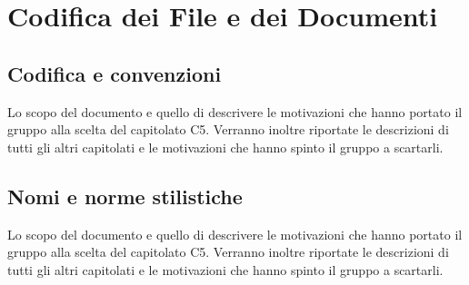 \section{Codifica dei File e dei Documenti}
\subsection{Codifica e convenzioni}
Lo scopo del documento e quello di descrivere le motivazioni che hanno portato il gruppo alla scelta del capitolato C5.
Verranno inoltre riportate le descrizioni di tutti gli altri capitolati e le motivazioni che hanno spinto il gruppo a scartarli.

\subsection{Nomi e norme stilistiche}
Lo scopo del documento e quello di descrivere le motivazioni che hanno portato il gruppo alla scelta del capitolato C5.
Verranno inoltre riportate le descrizioni di tutti gli altri capitolati e le motivazioni che hanno spinto il gruppo a scartarli.
